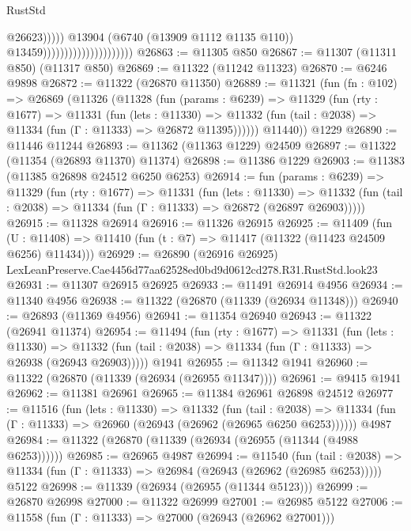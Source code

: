 \begin{lexlean}{RustStd}
\begin{coremodule}
                                                        @26623)))))
                                              @13904
                                              (@6740 (@13909 @1112 @1135 @110))
                                              @13459)))))))))))))))))))))
@26863 := @11305 @850
@26867 := @11307 (@11311 @850) (@11317 @850)
@26869 := @11322 (@11242 @11323)
@26870 := @6246 @9898
@26872 := @11322 (@26870 @11350)
@26889 := @11321
    (fun (fn : @102) =>
    @26869
      (@11326
        (@11328
          (fun (params : @6239) =>
          @11329
            (fun (rty : @1677) =>
            @11331
              (fun (lets : @11330) =>
              @11332 (fun (tail : @2038) => @11334 (fun (Γ : @11333) => @26872 @11395))))))
        @11440))
    @1229
@26890 := @11446 @11244
@26893 := @11362 (@11363 @1229) @24509
@26897 := @11322 (@11354 (@26893 @11370) @11374)
@26898 := @11386 @1229
@26903 := @11383 (@11385 @26898 @24512 @6250 @6253)
@26914 := fun (params : @6239) =>
  @11329
    (fun (rty : @1677) =>
    @11331
      (fun (lets : @11330) =>
      @11332 (fun (tail : @2038) => @11334 (fun (Γ : @11333) => @26872 (@26897 @26903)))))
@26915 := @11328 @26914
@26916 := @11326 @26915
@26925 := @11409
    (fun (U : @11408) => @11410 (fun (t : @7) => @11417 (@11322 (@11423 @24509 @6256) @11434)))
@26929 := @26890
    (@26916 @26925)
    LexLeanPreserve.Cae4456d77aa62528ed0bd9d0612cd278.R31.RustStd.look23
@26931 := @11307 @26915 @26925
@26933 := @11491 @26914 @4956
@26934 := @11340 @4956
@26938 := @11322 (@26870 (@11339 (@26934 @11348)))
@26940 := @26893 (@11369 @4956)
@26941 := @11354 @26940
@26943 := @11322 (@26941 @11374)
@26954 := @11494
    (fun (rty : @1677) =>
    @11331
      (fun (lets : @11330) =>
      @11332 (fun (tail : @2038) => @11334 (fun (Γ : @11333) => @26938 (@26943 @26903)))))
    @1941
@26955 := @11342 @1941
@26960 := @11322 (@26870 (@11339 (@26934 (@26955 @11347))))
@26961 := @9415 @1941
@26962 := @11381 @26961
@26965 := @11384 @26961 @26898 @24512
@26977 := @11516
    (fun (lets : @11330) =>
    @11332
      (fun (tail : @2038) =>
      @11334 (fun (Γ : @11333) => @26960 (@26943 (@26962 (@26965 @6250 @6253))))))
    @4987
@26984 := @11322 (@26870 (@11339 (@26934 (@26955 (@11344 (@4988 @6253))))))
@26985 := @26965 @4987
@26994 := @11540
    (fun (tail : @2038) => @11334 (fun (Γ : @11333) => @26984 (@26943 (@26962 (@26985 @6253)))))
    @5122
@26998 := @11339 (@26934 (@26955 (@11344 @5123)))
@26999 := @26870 @26998
@27000 := @11322 @26999
@27001 := @26985 @5122
@27006 := @11558 (fun (Γ : @11333) => @27000 (@26943 (@26962 @27001)))

\end{coremodule}
\end{lexlean}
